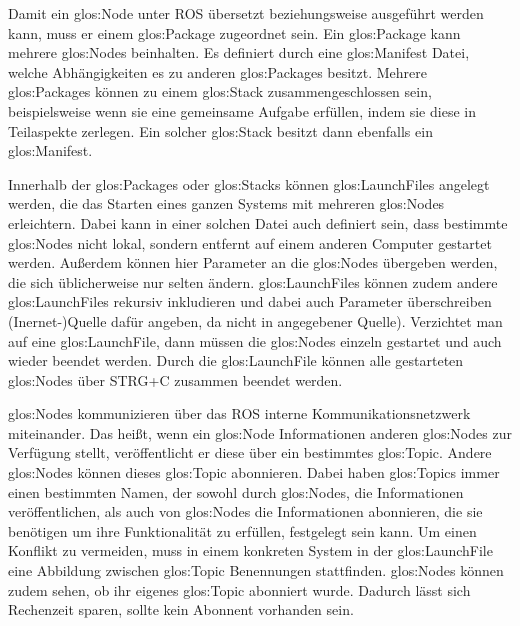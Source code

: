 Damit ein \gls{glos:Node} unter \gls{ROS} übersetzt beziehungsweise ausgeführt werden kann, muss er einem \gls{glos:Package} zugeordnet sein. Ein \gls{glos:Package} kann mehrere \glspl{glos:Node} beinhalten. Es definiert durch eine \gls{glos:Manifest} Datei, welche Abhängigkeiten es zu anderen \glspl{glos:Package} besitzt. Mehrere \glspl{glos:Package} können zu einem \gls{glos:Stack} zusammengeschlossen sein, beispielsweise wenn sie eine gemeinsame Aufgabe erfüllen, indem sie diese in Teilaspekte zerlegen. Ein solcher \gls{glos:Stack} besitzt dann ebenfalls ein \gls{glos:Manifest}.

Innerhalb der \glspl{glos:Package} oder \glspl{glos:Stack} können \glspl{glos:LaunchFile} angelegt werden, die das Starten eines ganzen Systems mit mehreren \glspl{glos:Node} erleichtern. Dabei kann in einer solchen Datei auch definiert sein, dass bestimmte \glspl{glos:Node} nicht lokal, sondern entfernt auf einem anderen Computer gestartet werden. Außerdem können hier Parameter an die \glspl{glos:Node} übergeben werden, die sich üblicherweise nur selten ändern. \glspl{glos:LaunchFile} können zudem andere \glspl{glos:LaunchFile} rekursiv inkludieren und dabei auch Parameter überschreiben{\color{red} (Inernet-)Quelle dafür angeben, da nicht in angegebener Quelle)}. Verzichtet man auf eine \gls{glos:LaunchFile}, dann müssen die \glspl{glos:Node} einzeln gestartet und auch wieder beendet werden. Durch die \gls{glos:LaunchFile} können alle gestarteten \glspl{glos:Node} über STRG+C zusammen beendet werden.

\glspl{glos:Node} kommunizieren über das \gls{ROS} interne Kommunikationsnetzwerk miteinander. Das heißt, wenn ein \gls{glos:Node} Informationen anderen \glspl{glos:Node} zur Verfügung stellt, veröffentlicht er diese über ein bestimmtes \gls{glos:Topic}. Andere \glspl{glos:Node} können dieses \gls{glos:Topic} abonnieren. Dabei haben \glspl{glos:Topic} immer einen bestimmten Namen, der sowohl durch \glspl{glos:Node}, die Informationen veröffentlichen, als auch von \glspl{glos:Node} die Informationen abonnieren, die sie benötigen um ihre Funktionalität zu erfüllen, festgelegt sein kann. Um einen Konflikt zu vermeiden, muss in einem konkreten System in der \gls{glos:LaunchFile} eine Abbildung zwischen \gls{glos:Topic} Benennungen stattfinden. \glspl{glos:Node} können zudem sehen, ob ihr eigenes \gls{glos:Topic} abonniert wurde. Dadurch lässt sich Rechenzeit sparen, sollte kein Abonnent vorhanden sein.


